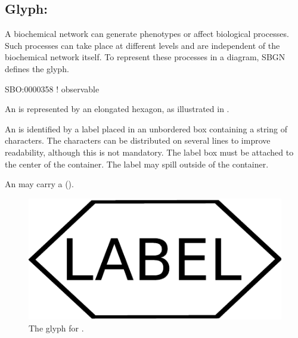 
\color{red}

\subsection{Glyph: }
\label{sec:observable}

A biochemical network can generate phenotypes or affect biological
processes.  Such processes can take place at different levels and are
independent of the biochemical network itself.  To represent these
processes in a diagram, SBGN defines the  glyph.

\begin{glyphDescription}

\glyphSboTerm SBO:0000358 ! observable

\glyphContainer An  is represented by an elongated
hexagon, as illustrated in .

\glyphLabel An  is identified by a label placed in an
unbordered box containing a string of characters.  The characters can be
distributed on several lines to improve readability, although this is not
mandatory.  The label box must be attached to the center of the
 container.  The label may spill outside of the container.

\glyphAux An  may carry a 
().

\end{glyphDescription}
 
\begin{figure}[H]
  \centering
  \includegraphics[scale = 0.3]{images/observable}
  \caption{The \ER glyph for .}
  \label{fig:observable}
\end{figure}

\normalcolor

